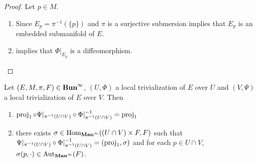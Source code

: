 \documentclass{book}
\begin{document}
	\begin{proof}
		Let $p \in M$. 
		\begin{enumerate}
			\item Since $E_p = \pi^{-1}(\{p\})$ and $\pi$ is a surjective submersion   implies that $E_p$ is an embedded submanifold of $E$. 
			\item {}  implies that $\Phi|_{E_p}$ is a diffeomorphism. 
		\end{enumerate}
	\end{proof}

	
	

	\begin{ex} 
		Let $(E, M, \pi, F) \in \operatorname*{\text{\textbf{Bun}}^{\infty}}$, $(U, \Phi)$ a local trivialization of $E$ over $U$ and $(V, \Psi)$ a local trivialization of $E$ over $V$. Then 
		\begin{enumerate}
			\item $\operatorname{\text{proj}}_1 \circ \Psi|_{\pi^{-1}(U \cap V)} \circ \Phi|^{-1}_{\pi^{-1}(U \cap V)} = \operatorname{\text{proj}}_1$
			\item there exists $\sigma \in \operatorname{Hom}_{\operatorname*{\text{\textbf{Man}}^{\infty}}}(( U \cap V) \times F,  F)$ such that $\Psi|_{\pi^{-1}(U \cap V)} \circ \Phi|^{-1}_{\pi^{-1}(U \cap V)} = (\operatorname{\text{proj}}_1, \sigma)$ and for each $p \in U \cap V$, $\sigma(p, \cdot) \in \operatorname{Aut}_{\operatorname*{\text{\textbf{Man}}^{\infty}}}(F)$.  
		\end{enumerate}
	\end{ex}
\end{document}
